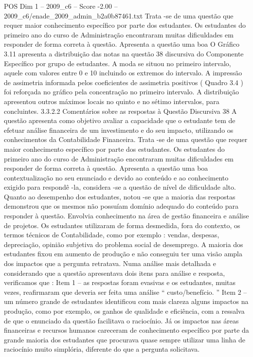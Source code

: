 \begin{textsample}{POS Dim 1 – 2009\_c6 – Score -2.00 – 2009\_c6/enade\_2009\_admin\_b2a0b87461.txt}
Trata -se de uma questão que requer maior conhecimento específico por parte dos estudantes.
Os estudantes do primeiro ano do curso de Administração encontraram muitas dificuldades em responder de forma correta à questão.
Apresenta a questão uma boa O Gráfico 3.11 apresenta a distribuição das notas na questão 38 discursiva do Componente Específico por grupo de estudantes.
A moda se situou no primeiro intervalo, aquele com valores entre 0 e 10 incluindo os extremos do intervalo.
A impressão de assimetria informada pelos coeficientes de assimetria positivos ( Quadro 3.4 ) foi reforçada no gráfico pela concentração no primeiro intervalo.
A distribuição apresentou outros máximos locais no quinto e no sétimo intervalos, para concluintes. 3.3.2.2 Comentários sobre as respostas à Questão Discursiva 38 A questão apresenta como objetivo avaliar a capacidade que o estudante tem de efetuar análise financeira de um investimento e do seu impacto, utilizando os conhecimentos da Contabilidade Financeira.
Trata -se de uma questão que requer maior conhecimento específico por parte dos estudantes.
Os estudantes do primeiro ano do curso de Administração encontraram muitas dificuldades em responder de forma correta à questão.
Apresenta a questão uma boa contextualização no seu enunciado e devido ao conteúdo e ao conhecimento exigido para respondê -la, considera -se a questão de nível de dificuldade alto.
Quanto ao desempenho dos estudantes, notou -se que a maioria das respostas demonstrou que os mesmos não possuíam domínio adequado do conteúdo para responder à questão.
Envolvia conhecimento na área de gestão financeira e análise de projetos.
Os estudantes utilizaram de forma desmedida, fora do contexto, os termos técnicos de Contabilidade, como por exemplo : vendas, despesas, depreciação, opinião subjetiva do problema social de desemprego.
A maioria dos estudantes fixou em aumento de produção e não conseguiu ter uma visão ampla dos impactos que a pergunta retratava.
Numa análise mais detalhada e considerando que a questão apresentava dois itens para análise e resposta, verificamos que : Item 1 – as respostas foram evasivas e os estudantes, muitas vezes, reafirmaram que deveria ser feita uma análise “ custo/benefício. ” Item 2 – um número grande de estudantes identificou com mais clareza alguns impactos na produção, como por exemplo, os ganhos de qualidade e eficiência, com a ressalva de que o enunciado da questão facilitava o raciocínio.
Já os impactos nas áreas financeiras e recursos humanos careceram de conhecimento específico por parte da grande maioria dos estudantes que procurava quase sempre utilizar uma linha de raciocínio muito simplória, diferente do que a pergunta solicitava.

\end{textsample}
